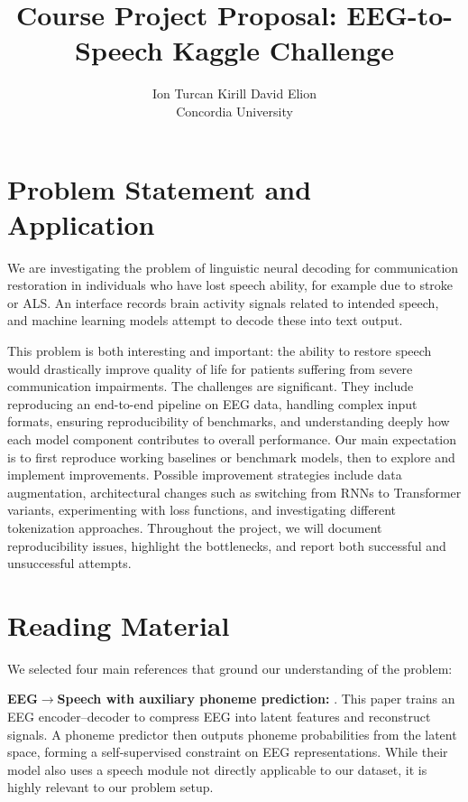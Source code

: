 \documentclass[10pt,twocolumn,letterpaper]{article}
\title{Course Project Proposal: EEG-to-Speech Kaggle Challenge}
\author{
Ion Turcan \quad Kirill \quad David \quad Elion\\
Concordia University
}
\begin{document}
\maketitle
\thispagestyle{empty}


\section{Problem Statement and Application}
We are investigating the problem of linguistic neural decoding for communication restoration in individuals who have lost speech ability, for example due to stroke or ALS. An interface records brain activity signals related to intended speech, and machine learning models attempt to decode these into text output.

This problem is both interesting and important: the ability to restore speech would drastically improve quality of life for patients suffering from severe communication impairments. The challenges are significant. They include reproducing an end-to-end pipeline on EEG data, handling complex input formats, ensuring reproducibility of benchmarks, and understanding deeply how each model component contributes to overall performance. Our main expectation is to first reproduce working baselines or benchmark models, then to explore and implement improvements. Possible improvement strategies include data augmentation, architectural changes such as switching from RNNs to Transformer variants, experimenting with loss functions, and investigating different tokenization approaches. Throughout the project, we will document reproducibility issues, highlight the bottlenecks, and report both successful and unsuccessful attempts.

\section{Reading Material}
We selected four main references that ground our understanding of the problem:

\textbf{EEG$\to$Speech with auxiliary phoneme prediction:} \cite{lee_enhancing_2025}.  
This paper trains an EEG encoder--decoder to compress EEG into latent features and reconstruct signals. A phoneme predictor then outputs phoneme probabilities from the latent space, forming a self-supervised constraint on EEG representations. While their model also uses a speech module not directly applicable to our dataset, it is highly relevant to our problem setup.
\end{document}
